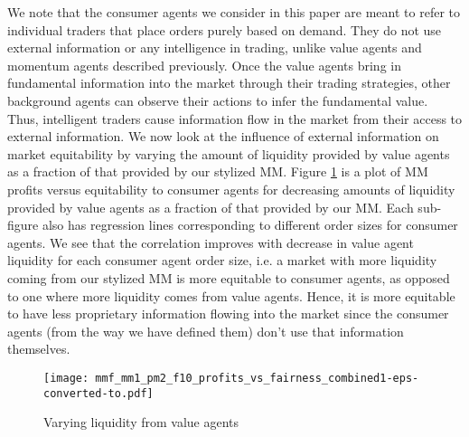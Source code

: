 \documentclass[sigconf]{acmart}
\begin{document}
We note that the consumer agents we consider in this paper are meant to refer to individual traders that place orders purely based on demand. They do not use external information or any intelligence in trading, unlike value agents and momentum agents described previously. Once the value agents bring in fundamental information into the market through their trading strategies, other background agents can observe their actions to infer the fundamental value. Thus, intelligent traders cause information flow in the market from their access to external information. We now look at the influence of external information on market equitability by varying the amount of liquidity provided by value agents as a fraction of that provided by our stylized MM. Figure \ref{fig:mmf3} is a plot of MM profits versus equitability to consumer agents for decreasing amounts of liquidity provided by value agents as a fraction of that provided by our MM. Each sub-figure also has regression lines corresponding to different order sizes for consumer agents. We see that the correlation improves with decrease in value agent liquidity for each consumer agent order size, i.e. a market with more liquidity coming from our stylized MM is more equitable to consumer agents, as opposed to one where more liquidity comes from value agents. Hence, it is more equitable to have less proprietary information flowing into the market since the consumer agents (from the way we have defined them) don't use that information themselves. 
\begin{figure}[h]
    \centering
    \texttt{[image: mmf\_mm1\_pm2\_f10\_profits\_vs\_fairness\_combined1-eps-converted-to.pdf]}
    \caption{Varying liquidity from value agents}
    \label{fig:mmf3}
\end{figure}
\end{document}
